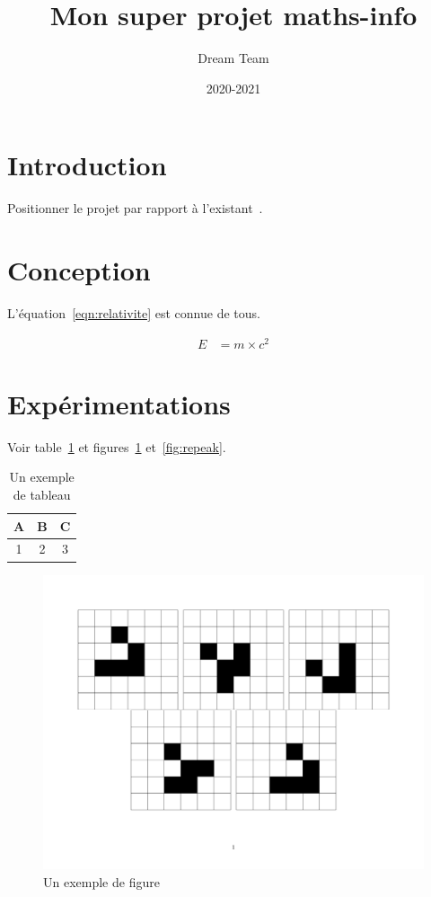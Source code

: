 \documentclass[11pt,a4paper]{article}
\title{Mon super projet maths-info}
\author{Dream Team}
\date{2020-2021}
\def\energie{E}
\def\masse{m}
\def\vitesse{c}
\begin{document}
\maketitle


\tableofcontents
\clearpage
\section{Introduction}

\lipsum[2-4]

Positionner le projet par rapport à l'existant~\cite{Pedregosa2011Scikit, Rahimi2008Random}.

\section{Conception}
\lipsum[5]

L'équation~\eqref{eqn:relativite} est connue de tous.

\begin{align}
\energie & = \masse \times \vitesse^2
\label{eqn:relativite}
\end{align}

\section{Expérimentations}
\lipsum[6]

Voir table~\ref{tab:exemple} et figures~\ref{fig:gol} et~\ref{fig:repeak}.

\begin{table}[tbh]
\centering
\begin{tabular}{|c|c|c|}
\hline
A & B & C\\
\hline
1 & 2 & 3\\
\hline
\end{tabular}
\caption{\label{tab:exemple} Un exemple de tableau}
\end{table}

\lipsum[7]

\begin{figure}[tbh]
\centering
\includegraphics[width=.8\textwidth]{gol_image}
\caption{\label{fig:gol} Un exemple de figure}
\end{figure}
\end{document}
